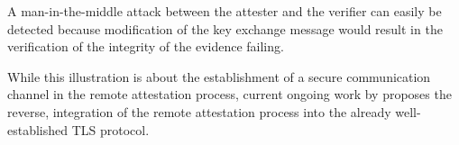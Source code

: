 A man-in-the-middle attack between the attester and the verifier can easily be
detected because modification of the key exchange message would result in the
verification of the integrity of the evidence failing.

While this illustration is about the establishment of a secure communication
channel in the remote attestation process, current ongoing work by
\citeauthor{fossati-tls-attestation-02} \cite{fossati-tls-attestation-02}
proposes the reverse, integration of the remote attestation process into the
already well-established TLS protocol.
